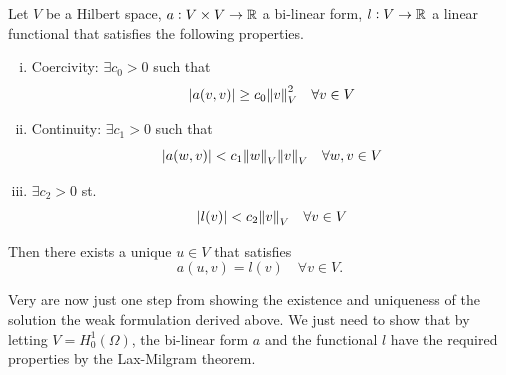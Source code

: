 \begin{theorem}
	Let $ V $ be a Hilbert space, $ a:V\times V \to \mathbb{R} $ a bi-linear form, $ l: V \to \mathbb{R} $ a linear functional that satisfies the following properties.
	\begin{enumerate}[(i)]
		\item Coercivity: $ \exists c_0>0$ such that 
		\[  |a(v,v)| \geq c_0 \norm{v}_V^2 \quad \forall v \in V \]
		\item Continuity: $ \exists c_1>0 $ such that
		\[ |a(w,v)| < c_1 \norm{w}_V\norm{v}_V \quad \forall w,v \in V \]
		\item $ \exists c_2 > 0 $ st.
		\[ |l(v)| < c_2 \norm{v}_V \quad \forall v \in V \]
	\end{enumerate}
	Then there exists a unique $ u \in V $ that satisfies
	\[ a(u,v) = l(v) \quad \forall v \in V. \]
\end{theorem}

Very are now just one step from showing the existence and uniqueness of the solution the weak formulation derived above. We just need to show that by letting $ V = H_0^1(\Omega) $, the bi-linear form $ a $ and the functional $ l $ have the required properties by the Lax-Milgram theorem. 



